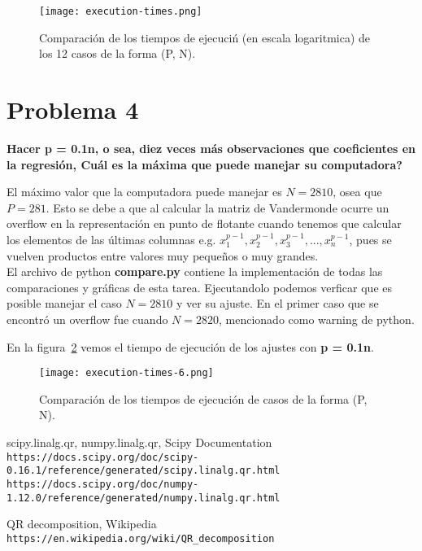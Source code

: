 \documentclass[12pt,letterpaper]{article}
\begin{document}
\begin{figure}[!h]
\centering
\texttt{[image: execution-times.png]}
\caption{Comparaci\'on de los tiempos de ejecuci\'n (en escala logaritmica) de los 12 casos de la forma (P, N).}
\label{executiontimecomparison}
\end{figure}

\section*{Problema 4}
\textbf{Hacer p = 0.1n, o sea, diez veces m\'as observaciones que coeficientes en la regresi\'on, \textquestiondown Cu\'al es la m\'axima que puede manejar su computadora? }

El m\'aximo valor que la computadora puede manejar es $N = 2810$, osea que $P = 281$. Esto se debe a que al calcular la matriz de Vandermonde ocurre un overflow en la representaci\'on en punto de flotante cuando tenemos que calcular los elementos de las \'ultimas columnas e.g. $x_1^{p-1},  x_2^{p-1}, x_3^{p-1}, ..., x_n^{p-1}$, pues se vuelven productos entre valores muy peque\~nos o muy grandes. \\

El archivo de python \textbf{compare.py} contiene la implementaci\'on de todas las comparaciones y gr\'aficas de esta tarea. Ejecutandolo podemos verficar que es posible manejar el caso $N=2810$ y ver su ajuste. En el primer caso que se encontr\'o un overflow fue cuando $N=2820$, mencionado como warning de python.

En la figura~\ref{executiontimecomparison1} vemos el tiempo de ejecuci\'on de los ajustes con \textbf{p = 0.1n}. 

\begin{figure}[!h]
\centering
\texttt{[image: execution-times-6.png]}
\caption{Comparaci\'on de los tiempos de ejecuci\'on de casos de la forma (P, N).}
\label{executiontimecomparison1}
\end{figure}

\begin{thebibliography}{9}

scipy.linalg.qr, numpy.linalg.qr, Scipy Documentation
\\\texttt{https://docs.scipy.org/doc/scipy-0.16.1/reference/generated/scipy.linalg.qr.html}
\\\texttt{https://docs.scipy.org/doc/numpy-1.12.0/reference/generated/numpy.linalg.qr.html}


QR decomposition, Wikipedia
\\\texttt{https://en.wikipedia.org/wiki/QR\_decomposition}

\end{thebibliography}
\end{document}
